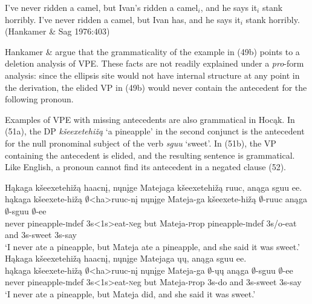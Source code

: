 \documentclass[output=paper]{LSP/langsci}
\begin{document}
\begin{singlespacing}
\begin{exe}
\ex
\begin{xlist}
\ex
I've never ridden a camel, but Ivan's ridden a camel$_i$, and he says it$_i$ stank horribly.
\vspace{12pt}
\ex
I've never ridden a camel, but Ivan has, and he says it$_i$ stank horribly. (Hankamer \& Sag 1976:403)
\end{xlist}
\end{exe}
\end{singlespacing}

\begin{exe}
\end{exe}

Hankamer \& \citet{Sag1976} argue that the grammaticality of the example in (49b) points to a deletion analysis of VPE. These facts are not readily explained under a \emph{pro}-form analysis: since the ellipsis site would not have internal structure at any point in the derivation, the elided VP in (49b) would never contain the antecedent for the following pronoun. 

Examples of VPE with missing antecedents are also grammatical in Hocąk. In (51a), the DP \emph{kšeexetehižą} `a pineapple' in the second conjunct is the antecedent for the null pronominal subject of the verb \emph{sguu} `sweet'. In (51b), the VP containing the antecedent is elided, and the resulting sentence is grammatical. Like English, a pronoun cannot find its antecedent in a negated clause (52).

\begin{exe}
\ex
\begin{xlist}
\ex
\glll Hąkaga kšeexetehižą haacnį, nųnįge Matejaga kšeexetehižą ruuc, anąga sguu ee.\\
hąkaga kšeexete-hižą $\emptyset$<ha>ruuc-nį nųnįge Mateja-ga kšeexete-hižą $\emptyset$-ruuc anąga $\emptyset$-sguu $\emptyset$-ee\\
never pineapple-{\textsc indef} {\textsc 3s<1s>}eat-{\textsc neg} but Mateja-{\textsc prop} pineapple-{\textsc indef} {\textsc 3s/o}-eat and {\textsc 3s}-sweet {\textsc 3s}-say\\
\trans `I never ate a pineapple, but Mateja ate a pineapple, and she said it was sweet.'
\ex
\glll Hąkaga kšeexetehižą haacnį, nųnįge Matejaga ųų, anąga sguu ee.\\
hąkaga kšeexete-hižą $\emptyset$<ha>ruuc-nį nųnįge Mateja-ga $\emptyset$-ųų anąga $\emptyset$-sguu $\emptyset$-ee\\
never pineapple-{\textsc indef} {\textsc 3s<1s>}eat-{\textsc neg} but Mateja-{\textsc prop} {\textsc 3s}-do and {\textsc 3s}-sweet {\textsc 3s}-say\\
\trans `I never ate a pineapple, but Mateja did, and she said it was sweet.'
\end{xlist}
\end{exe}
\end{document}
